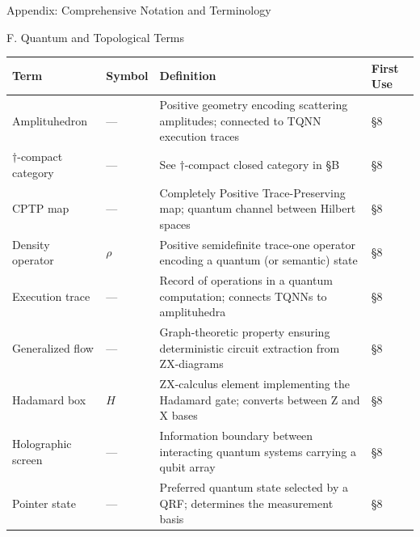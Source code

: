 \documentclass[
  ignorenonframetext,
]{beamer}
\newcounter{none} %
\begin{document}
\begin{frame}[fragile]{Appendix: Comprehensive Notation and Terminology}
\begin{block}{F. Quantum and Topological Terms}
\protect{}\label{f.-quantum-and-topological-terms}
{\def\LTcaptype{none} %
\begin{longtable}[]{@{}
  >{\raggedright\arraybackslash}p{}
  >{\centering\arraybackslash}p{}
  >{\raggedright\arraybackslash}p{}
  >{\centering\arraybackslash}p{}@{}}
\toprule\noalign{}
\begin{minipage}[b]{\linewidth}\raggedright
Term
\end{minipage} & \begin{minipage}[b]{\linewidth}\centering
Symbol
\end{minipage} & \begin{minipage}[b]{\linewidth}\raggedright
Definition
\end{minipage} & \begin{minipage}[b]{\linewidth}\centering
First Use
\end{minipage} \\
\midrule\noalign{}
\endhead
Amplituhedron & --- & Positive geometry encoding scattering amplitudes;
connected to TQNN execution traces & §8 \\
\(\dagger\)-compact category & --- & See \(\dagger\)-compact closed
category in §B & §8 \\
CPTP map & --- & Completely Positive Trace-Preserving map; quantum
channel between Hilbert spaces & §8 \\
Density operator & \(\rho\) & Positive semidefinite trace-one operator
encoding a quantum (or semantic) state & §8 \\
Execution trace & --- & Record of operations in a quantum computation;
connects TQNNs to amplituhedra & §8 \\
Generalized flow & --- & Graph-theoretic property ensuring deterministic
circuit extraction from ZX-diagrams & §8 \\
Hadamard box & \(H\) & ZX-calculus element implementing the Hadamard
gate; converts between Z and X bases & §8 \\
Holographic screen & --- & Information boundary between interacting
quantum systems carrying a qubit array & §8 \\
Pointer state & --- & Preferred quantum state selected by a QRF;
determines the measurement basis & §8 \\

\end{longtable}}
\end{block}
\end{frame}
\end{document}

